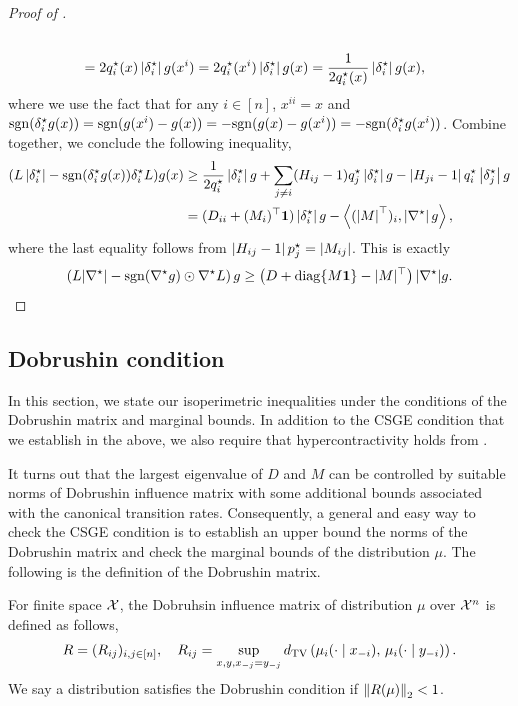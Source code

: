 \begin{proof}[Proof of ]
\begin{align}
        \\&= 2 q_i^\star(x) \left\vert\delta_i^\star\right\vert g(x^i)
        = 2 q_i^\star(x^i) \left\vert\delta_i^\star\right\vert g(x)
        = \frac 1{2q_i^\star(x)} \left\vert\delta_i^\star\right\vert g(x),
    \end{align}
    where we use the fact that for any $i\in[n]$, $x^{ii} = x$ and $\mathrm{sgn}(\delta^\star_i g(x)) = \mathrm{sgn}(g(x^i) - g(x)) = - \mathrm{sgn}(g(x) - g(x^i)) = -\mathrm{sgn}(\delta^\star_i g(x^i))$.
    Combine  together, we conclude the following inequality,
    \begin{align*}
        (L\left\vert\delta_i^\star\right\vert - \mathrm{sgn}(\delta^\star_i g(x))\delta_i^\star L) g(x) &\geq \frac{1}{2q_i^\star}\left\vert\delta^\star_i\right\vert g + \sum_{j\neq i} (H_{ij} - 1)q_j^\star\left\vert\delta^\star_i\right\vert g - \left\vert H_{ji} - 1\right\vert q_i^\star\left\vert\delta^\star_j\right\vert g
        \\&= (D_{ii} + (M_i)^\top \boldsymbol{1})\left\vert\delta^\star_i\right\vert g - \left\langle (\left\vert M\right\vert^\top)_i,\left\vert\nabla^\star\right\vert g\right\rangle, 
    \end{align*}
    where the last equality follows from $\left\vert H_{ij}-1\right\vert p_j^\star = \left\vert M_{ij}\right\vert$.
    This is exactly
    \[
        \left( L |\nabla^\star| - \mathrm{sgn}(\nabla^\star g) \odot \nabla^\star L \right) g \ge \left( D + \mathrm{diag}\{M\boldsymbol{1}\} - |M|^\top \right) |\nabla^\star| g. \qedhere
    \]
\end{proof}


\subsection{Dobrushin condition}
In this section, we state our isoperimetric inequalities under the conditions of the Dobrushin matrix and marginal bounds. 
In addition to the CSGE condition that we establish in the above, we also require that hypercontractivity holds from .

It turns out that the largest eigenvalue of $D$ and $M$ can be controlled by suitable norms of Dobrushin influence matrix with some additional bounds associated with the canonical transition rates.
Consequently, a general and easy way to check the CSGE condition is to establish an upper bound the norms of the Dobrushin matrix and check the marginal bounds of the distribution $\mu$.
The following is the definition of the Dobrushin matrix.
\begin{definition}
    For finite space $\mathcal{X}$, the Dobruhsin influence matrix of distribution $\mu$ over $\mathcal{X}^n$ is defined as follows,
    \begin{align}\label{eq:def_Dobrushin_matrix}
        R = (R_{ij})_{i,j\in[n]},\quad R_{ij} = \sup_{x,y,x_{-j}=y_{-j}}d_{\mathrm{TV}}\left({\mu_i(\cdot\mid x_{-i})},\,{\mu_i(\cdot\mid y_{-i})}\right) .
    \end{align}
    We say a distribution satisfies the Dobrushin condition if $\left\lVert R(\mu) \right\rVert_2 < 1$.
\end{definition}

